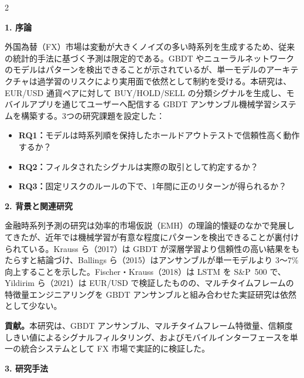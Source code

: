 \vspace{1mm}
\setcounter{table}{0}
\setcounter{figure}{0}
\renewcommand{\thetable}{\arabic{table}}
\renewcommand{\thefigure}{\arabic{figure}}
\setlength{\columnsep}{7mm}
\begin{multicols*}{2}
\setlength{\parskip}{4pt}
\setlength{\intextsep}{4pt}
\setlength{\textfloatsep}{4pt}
\setlength{\abovecaptionskip}{2pt}
\setlength{\belowcaptionskip}{2pt}
\sloppy

\noindent\textbf{1. 序論}

外国為替（FX）市場は変動が大きくノイズの多い時系列を生成するため、従来の統計的手法に基づく予測は限定的である。GBDT やニューラルネットワークのモデルはパターンを検出できることが示されているが、単一モデルのアーキテクチャは過学習のリスクにより実用面で依然として制約を受ける。本研究は、EUR/USD 通貨ペアに対して BUY/HOLD/SELL の分類シグナルを生成し、モバイルアプリを通じてユーザーへ配信する GBDT アンサンブル機械学習システムを構築する。3つの研究課題を設定した：
\begin{itemize}\setlength\itemsep{0pt}\small
    \item \textbf{RQ1：}モデルは時系列順を保持したホールドアウトテストで信頼性高く動作するか？
    \item \textbf{RQ2：}フィルタされたシグナルは実際の取引として約定するか？
    \item \textbf{RQ3：}固定リスクのルールの下で、1年間に正のリターンが得られるか？
\end{itemize}

\noindent\textbf{2. 背景と関連研究}

金融時系列予測の研究は効率的市場仮説（EMH）の理論的懐疑のなかで発展してきたが、近年では機械学習が有意な程度にパターンを検出できることが裏付けられている。Krauss ら（2017）は GBDT が深層学習より信頼性の高い結果をもたらすと結論づけ、Ballings ら（2015）はアンサンブルが単一モデルより 3〜7\% 向上することを示した。Fischer・Krauss（2018）は LSTM を S\&P~500 で、Yildirim ら（2021）は EUR/USD で検証したものの、マルチタイムフレームの特徴量エンジニアリングを GBDT アンサンブルと組み合わせた実証研究は依然として少ない。

\textbf{貢献。}本研究は、GBDT アンサンブル、マルチタイムフレーム特徴量、信頼度しきい値によるシグナルフィルタリング、およびモバイルインターフェースを単一の統合システムとして FX 市場で実証的に検証した。

\noindent\textbf{3. 研究手法}


\end{multicols*}
